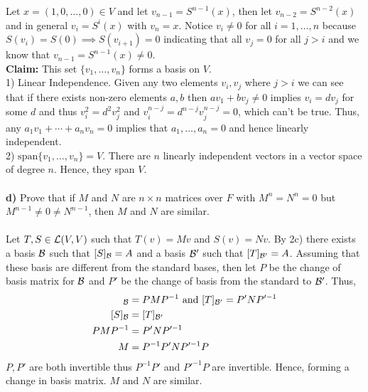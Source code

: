 \documentclass[11pt]{amsart}
\theoremstyle{definition}  %
\begin{document}
Let $x=(1,0,\dots,0) \in V$ and let $v_{n-1} = S^{n-1}(x)$, then let $v_{n-2}=S^{n-2}(x)$ and in general $v_i = S^{i}(x)$ with $v_n=x$.  Notice $v_i \ne0$ for all $i=1,\dots,n$ because $S(v_i)=S(0) \implies S(v_{i+1})=0$ indicating that all $v_j=0$ for all $j>i$ and we know that $v_{n-1}=S^{n-1}(x) \ne 0$.  \\
\textbf{Claim: } This set $\{v_1, \dots, v_n\}$ forms a basis on $V$.  \\
1) Linear Independence.  Given any two elements $v_i, v_j$ where $j>i$ we can see that if there exists non-zero elements $a,b$ then $av_1+bv_j \ne 0$ implies $v_i = dv_j$ for some $d$ and thus $v_i^2=d^2v_j^2$ and $v_i^{n-j}=d^{n-j}v_j^{n-j}=0$, which can't be true.  Thus, any $a_1v_1+\cdots+a_nv_n=0$ implies that $a_1,\dots,a_n=0$ and hence linearly independent. \\
2) $\mathrm{span}\{v_1, \dots, v_n\}=V$.  There are $n$ linearly independent vectors in a vector space of degree $n$.  Hence, they span $V$.\\
\\
{\bf d)} Prove that if $M$ and $N$ are $n \times n$ matrices over $F$ with $M^n = N^n = 0$ but $M^{n-1} \neq 0 \neq  N^{n-1}$, then
$M$ and $N$ are similar. \\
\\
Let $T, S \in \mathcal{L}(V,V)$ such that $T(v)=Mv$ and $S(v)=Nv$.  By 2c) there exists a basis $\mathcal{B}$ such that $[S]_{\mathcal{B}} = A$ and a basis $\mathcal{B}'$ such that $[T]_{\mathcal{B}'} = A$.  Assuming that these basis are different from the standard bases, then let $P$ be the change of basis matrix for $\mathcal{B}$ and $P'$ be the change of basis from the standard to $\mathcal{B}'$.  Thus, 
\begin{align*}
	[S]_\BB &= PMP^{-1} \text{ and } [T]_{\BB'}= P'NP'^{-1}\\
	[S]_\BB &= [T]_{\BB'}\\
	PMP^{-1} &= P'NP'^{-1} \\
	M &= P^{-1}P'NP'^{-1}P
\end{align*}$P,P'$ are both invertible thus $P^{-1}P'$ and $P'^{-1}P$ are invertible.  Hence, forming a change in basis matrix.  $M$ and $N$ are similar.
\\
\end{document}
